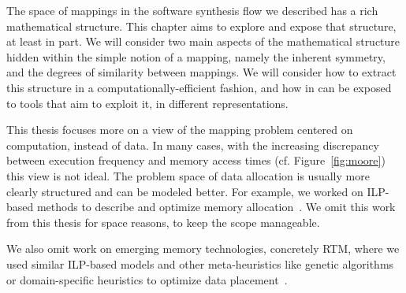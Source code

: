 The space of mappings in the software synthesis flow we described has a rich mathematical structure.
This chapter aims to explore and expose that structure, at least in part.
We will consider two main aspects of the mathematical structure hidden within the simple notion of a mapping, namely the inherent symmetry, and the degrees of similarity between mappings.
We will consider how to extract this structure in a computationally-efficient fashion, and how in can be exposed to tools that aim to exploit it, in different representations.

This thesis focuses more on a view of the mapping problem centered on computation, instead of data.
In many cases, with the increasing discrepancy between execution frequency and memory access times (cf. Figure~\ref{fig:moore}) this view is not ideal.
The problem space of data allocation is usually more clearly structured and can be modeled better. 
For example, we worked on \ac{ILP}-based methods to describe and optimize memory allocation~\cite{odendahl_date14,odendahl15,goens_jsa16}.
We omit this work from this thesis for space reasons, to keep the scope manageable.

We also omit work on emerging memory technologies, concretely \ac{RTM}, where we used similar \ac{ILP}-based models and other meta-heuristics like genetic algorithms or domain-specific heuristics to optimize data placement~\cite{khan_date20}.

